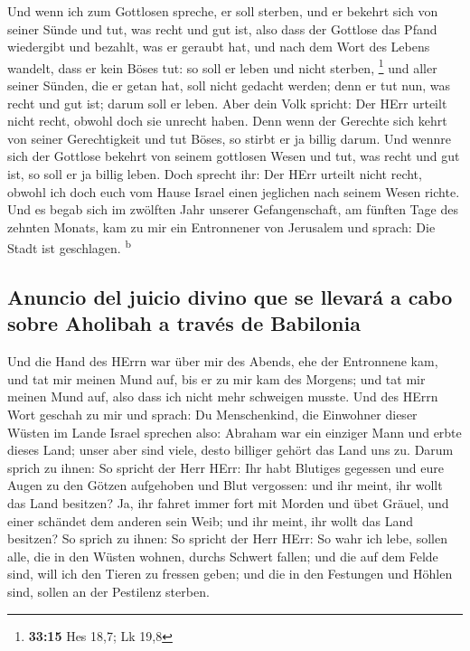  Und wenn ich zum Gottlosen spreche, er soll sterben, und
er bekehrt sich von seiner Sünde und tut, was recht und gut ist,
 also dass der Gottlose das Pfand wiedergibt und bezahlt,
was er geraubt hat, und nach dem Wort des Lebens wandelt, dass er kein
Böses tut: so soll er leben und nicht sterben, \footnote{\textbf{33:15}
  Hes 18,7; Lk 19,8}  und aller seiner Sünden, die er
getan hat, soll nicht gedacht werden; denn er tut nun, was recht und gut
ist; darum soll er leben.  Aber dein Volk spricht: Der
HErr urteilt nicht recht, obwohl doch sie unrecht haben. 
Denn wenn der Gerechte sich kehrt von seiner Gerechtigkeit und tut
Böses, so stirbt er ja billig darum.  Und wennre sich der
Gottlose bekehrt von seinem gottlosen Wesen und tut, was recht und gut
ist, so soll er ja billig leben.  Doch sprecht ihr: Der
HErr urteilt nicht recht, obwohl ich doch euch vom Hause Israel einen
jeglichen nach seinem Wesen richte.  Und es begab sich im
zwölften Jahr unserer Gefangenschaft, am fünften Tage des zehnten
Monats, kam zu mir ein Entronnener von Jerusalem und sprach: Die Stadt
ist geschlagen. \textsuperscript{b}

\hypertarget{anuncio-del-juicio-divino-que-se-llevaruxe1-a-cabo-sobre-aholibah-a-travuxe9s-de-babilonia}{%
\subsection{Anuncio del juicio divino que se llevará a cabo sobre
Aholibah a través de
Babilonia}\label{anuncio-del-juicio-divino-que-se-llevaruxe1-a-cabo-sobre-aholibah-a-travuxe9s-de-babilonia}}

 Und die Hand des HErrn war über mir des Abends, ehe der
Entronnene kam, und tat mir meinen Mund auf, bis er zu mir kam des
Morgens; und tat mir meinen Mund auf, also dass ich nicht mehr schweigen
musste.  Und des HErrn Wort geschah zu mir und sprach:
 Du Menschenkind, die Einwohner dieser Wüsten im Lande
Israel sprechen also: Abraham war ein einziger Mann und erbte dieses
Land; unser aber sind viele, desto billiger gehört das Land uns zu.
 Darum sprich zu ihnen: So spricht der Herr HErr: Ihr
habt Blutiges gegessen und eure Augen zu den Götzen aufgehoben und Blut
vergossen: und ihr meint, ihr wollt das Land besitzen? 
Ja, ihr fahret immer fort mit Morden und übet Gräuel, und einer schändet
dem anderen sein Weib; und ihr meint, ihr wollt das Land besitzen?
 So sprich zu ihnen: So spricht der Herr HErr: So wahr
ich lebe, sollen alle, die in den Wüsten wohnen, durchs Schwert fallen;
und die auf dem Felde sind, will ich den Tieren zu fressen geben; und
die in den Festungen und Höhlen sind, sollen an der Pestilenz sterben.

